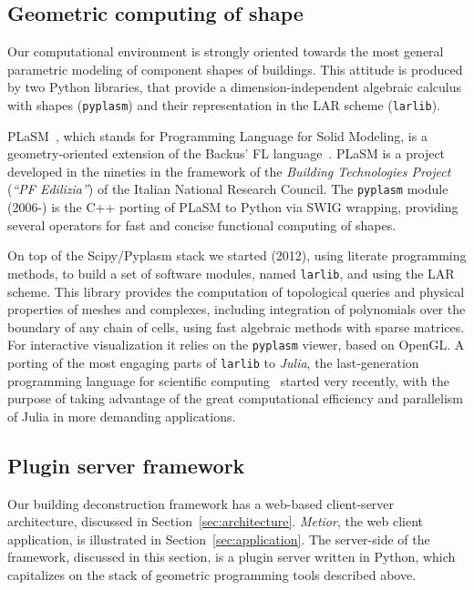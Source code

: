 \subsection{Geometric computing of shape}

Our computational environment is strongly oriented towards the most general parametric modeling of component shapes of buildings. This attitude is produced by two Python libraries, that provide a dimension-independent algebraic calculus with shapes (\texttt{pyplasm}) and their representation in the LAR scheme (\texttt{larlib}). 

PLaSM~\cite{Paoluzzi:1995:GPP:212332.212349,Paoluzzi2003a}, which stands for Programming Language for Solid Modeling, is a geometry-oriented extension of the Backus' FL language~\cite{backus:78,BWWLA89}.  PLaSM is a project developed in the nineties in the framework of the \emph{Building Technologies Project} (\emph{``PF Edilizia''}) of the Italian National Research Council. The \texttt{pyplasm} module (2006-) is the C++ porting of PLaSM to Python via SWIG wrapping, providing several operators for fast and concise functional computing of shapes.

On top of the Scipy/Pyplasm stack we started (2012), using literate programming methods, to build a set of software modules, named \texttt{larlib}, and using the LAR scheme. This library provides the computation of topological queries and physical properties of meshes and complexes, including integration of polynomials over the boundary of any chain of cells, using fast algebraic methods with sparse matrices. For interactive visualization it relies on the \texttt{pyplasm} viewer, based on OpenGL.
A porting of the most engaging parts of \texttt{larlib} to \emph{Julia}, the last-generation programming language  for scientific computing~\cite{BEKS14} started very recently, with the purpose of taking advantage of the great computational efficiency and parallelism of Julia in more demanding applications. 

\subsection{Plugin server framework}

Our building deconstruction framework  has a web-based client-server architecture,  discussed in Section~\ref{sec:architecture}. 	\emph{Metior}, the web client application, is illustrated in Section~\ref{sec:application}. The server-side of the framework, discussed in this section, is a  plugin server written in Python, which capitalizes on the stack of geometric programming tools described above. 

